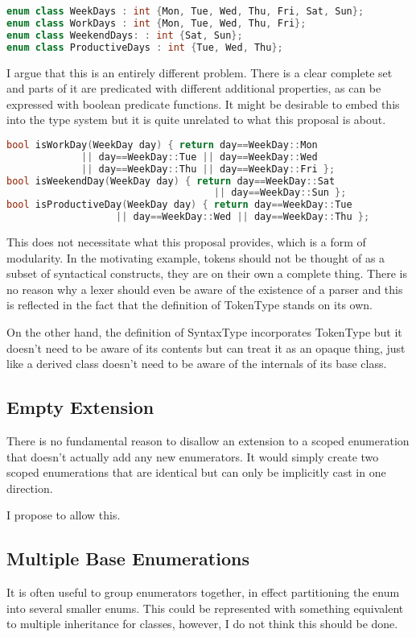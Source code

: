 \documentclass{scrartcl}
\begin{document}
\begin{lstlisting}[language=C++]
enum class WeekDays : int {Mon, Tue, Wed, Thu, Fri, Sat, Sun};
enum class WorkDays : int {Mon, Tue, Wed, Thu, Fri};
enum class WeekendDays: : int {Sat, Sun};
enum class ProductiveDays : int {Tue, Wed, Thu};
\end{lstlisting}

\noindent
I argue that this is an entirely different problem.
There is a clear complete set and parts of it are predicated with different additional properties, as can be expressed
with boolean predicate functions.
It might be desirable to embed this into the type system but it is quite unrelated to what this proposal is about.

\begin{lstlisting}[language=C++]
bool isWorkDay(WeekDay day) { return day==WeekDay::Mon
             || day==WeekDay::Tue || day==WeekDay::Wed
             || day==WeekDay::Thu || day==WeekDay::Fri };
bool isWeekendDay(WeekDay day) { return day==WeekDay::Sat
                                    || day==WeekDay::Sun };
bool isProductiveDay(WeekDay day) { return day==WeekDay::Tue
                   || day==WeekDay::Wed || day==WeekDay::Thu };
\end{lstlisting}

\noindent
This does not necessitate what this proposal provides, which is a form of modularity.
In the motivating example, tokens should not be thought of as a subset of syntactical constructs, they are on their own
a complete thing.
There is no reason why a lexer should even be aware of the existence of a parser and this is reflected in the fact that
the definition of TokenType stands on its own.

On the other hand, the definition of SyntaxType incorporates TokenType but it doesn't need to be aware of its contents
but can treat it as an opaque thing, just like a derived class doesn't need to be aware of the internals of its base
class.

\subsection{Empty Extension}
There is no fundamental reason to disallow an extension to a scoped enumeration that doesn't actually add any new enumerators.
It would simply create two scoped enumerations that are identical but can only be implicitly cast in one direction.

I propose to allow this.

\subsection{Multiple Base Enumerations}
It is often useful to group enumerators together, in effect partitioning the
enum into several smaller enums.
This could be represented with something equivalent to multiple inheritance for
classes, however, I do not think this should be done.
\end{document}
